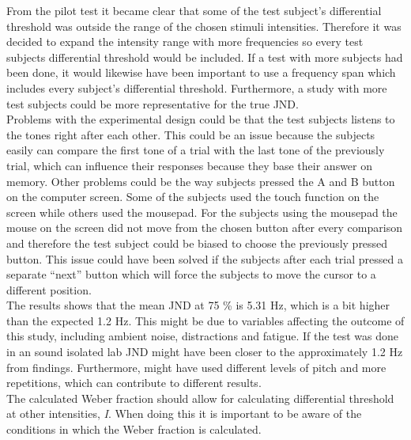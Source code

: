 From the pilot test it became clear that some of the test subject’s differential threshold was outside the range of the chosen stimuli intensities. Therefore it was decided to expand the intensity range with more frequencies so every test subjects differential threshold would be included. If a test with more subjects had been done, it would likewise have been important to use a frequency span which includes every subject’s differential threshold. Furthermore, a study with more test subjects could be more representative for the true JND.\\[5mm] 
%
Problems with the experimental design could be that the test subjects listens to the tones right after each other. This could be an issue because the subjects easily can compare the first tone of a trial with the last tone of the previously trial, which can influence their responses because they base their answer on memory. Other problems could be the way subjects pressed the A and B button on the computer screen. Some of the subjects used the touch function on the screen while others used the mousepad. For the subjects using the mousepad the mouse on the screen did not move from the chosen button after every comparison and therefore the test subject could be biased to choose the previously pressed button. This issue could have been solved if the subjects after each trial pressed a separate “next” button which will force the subjects to move the cursor to a different position.\\[5mm]
%  
The results shows that the mean JND at 75 \% is 5.31 Hz, which is a bit higher than the expected 1.2 Hz. This might be due to variables affecting the outcome of this study, including ambient noise, distractions and fatigue. If the test was done in an sound isolated lab JND might have been closer to the approximately 1.2 Hz from \citet{Wier1977} findings. Furthermore, \citet{Wier1977} might have used different levels of pitch and more repetitions, which can contribute to different results.\\[5mm] 
%
The calculated Weber fraction should allow for calculating differential threshold at other intensities, \textit{I}. When doing this it is important to be aware of the conditions in which the Weber fraction is calculated. 





 
